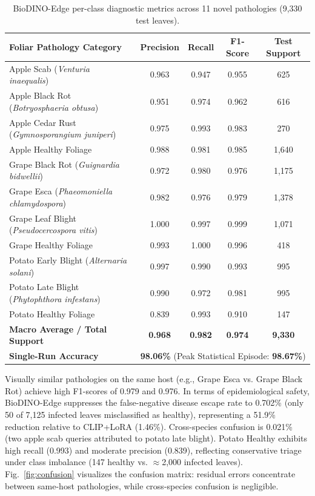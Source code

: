 \documentclass[preprint,12pt]{elsarticle}
\begin{document}
\begin{table}[htbp]
\caption{BioDINO-Edge per-class diagnostic metrics across 11 novel pathologies (9,330 test leaves).}
\label{tab:per_class}
\centering

\footnotesize
\setlength{\tabcolsep}{5pt}
\begin{tabularx}{\textwidth}{lcccc}
\toprule
\textbf{Foliar Pathology Category} & \textbf{Precision} & \textbf{Recall} & \textbf{F1-Score} & \textbf{Test Support} \\
\midrule
Apple Scab (\textit{Venturia inaequalis}) & 0.963 & 0.947 & 0.955 & 625 \\
Apple Black Rot (\textit{Botryosphaeria obtusa}) & 0.951 & 0.974 & 0.962 & 616 \\
Apple Cedar Rust (\textit{Gymnosporangium juniperi}) & 0.975 & 0.993 & 0.983 & 270 \\
Apple Healthy Foliage & 0.988 & 0.981 & 0.985 & 1,640 \\
\midrule
Grape Black Rot (\textit{Guignardia bidwellii}) & 0.972 & 0.980 & 0.976 & 1,175 \\
Grape Esca (\textit{Phaeomoniella chlamydospora}) & 0.982 & 0.976 & 0.979 & 1,378 \\
Grape Leaf Blight (\textit{Pseudocercospora vitis}) & 1.000 & 0.997 & 0.999 & 1,071 \\
Grape Healthy Foliage & 0.993 & 1.000 & 0.996 & 418 \\
\midrule
Potato Early Blight (\textit{Alternaria solani}) & 0.997 & 0.990 & 0.993 & 995 \\
Potato Late Blight (\textit{Phytophthora infestans}) & 0.990 & 0.972 & 0.981 & 995 \\
Potato Healthy Foliage & 0.839 & 0.993 & 0.910 & 147 \\
\midrule
\textbf{Macro Average / Total Support} & \textbf{0.968} & \textbf{0.982} & \textbf{0.974} & \textbf{9,330} \\
\textbf{Single-Run Accuracy} & \multicolumn{4}{c}{\textbf{98.06\%} (Peak Statistical Episode: \textbf{98.67\%})} \\
\bottomrule
\end{tabularx}
\end{table}

Visually similar pathologies on the same host (e.g., Grape Esca vs. Grape Black Rot) achieve high F1-scores of 0.979 and 0.976. In terms of epidemiological safety, BioDINO-Edge suppresses the false-negative disease escape rate to 0.702\% (only 50 of 7,125 infected leaves misclassified as healthy), representing a 51.9\% reduction relative to CLIP+LoRA (1.46\%). Cross-species confusion is 0.021\% (two apple scab queries attributed to potato late blight). Potato Healthy exhibits high recall (0.993) and moderate precision (0.839), reflecting conservative triage under class imbalance (147 healthy vs. $\approx$2,000 infected leaves). Fig.~\ref{fig:confusion} visualizes the confusion matrix: residual errors concentrate between same-host pathologies, while cross-species confusion is negligible.
\end{document}
